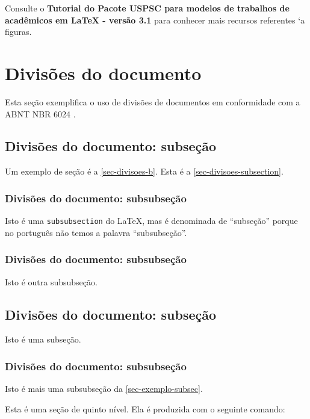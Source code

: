 Consulte o \textbf{Tutorial do Pacote USPSC para modelos de trabalhos de acad\^emicos em LaTeX - vers\~ao 3.1} para conhecer mais recursos referentes `a figuras. 

\section{Divisões do documento}\label{sec-divisoes-b}
Esta seção exemplifica o uso de divisões de documentos em conformidade com a ABNT NBR 6024  \cite{nbr6024}.
\subsection{Divisões do documento: subseção}\label{sec-divisoes-subsection}

Um exemplo de seção \'e a \autoref{sec-divisoes-b}. Esta \'e a \autoref{sec-divisoes-subsection}.

\subsubsection{Divisões do documento: subsubseção}\label{sec-divisoes-subsubsection}

Isto \'e uma \texttt{subsubsection} do \LaTeX, mas \'e denominada de ``subseção'' porque no portugu\^es não temos a palavra ``subsubseção''.

\subsubsection{Divisões do documento: subsubseção}

Isto \'e outra subsubseção.

\subsection{Divisões do documento: subseção}\label{sec-exemplo-subsec}

Isto \'e uma subseção.

\subsubsection{Divisões do documento: subsubseção}

Isto \'e mais uma subsubseção da \autoref{sec-exemplo-subsec}.


\label{sec-exemplo-subsubsubsection}

Esta \'e uma seção de quinto nível. Ela \'e produzida com o seguinte comando:

